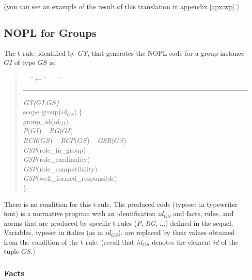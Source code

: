 \documentclass{article}
\newenvironment{rwrule}[2]
{\begin{quote}\ttfamily\begin{tabbing}~~~\=$\leftarrow$ \= ~~~ \= \kill
     \ensuremath{#2}\\
     \rule[2pt]{6.5cm}{.3pt} \hfill \rwlabel{#1}\\}
{\end{tabbing}\end{quote}}
\newcommand{\rwlabel}[1]{{\scshape\itshape\textrm{#1}}}
\theoremstyle{definition} \newtheorem{definition}{Definition}
\begin{document}
(you can see an example of the result of this translation in appendix \ref{apx:wp}.)


\subsection{NOPL for Groups}

The t-rule, identified by \rwlabel{GT}, that generates the NOPL code
for a group instance $GI$ of type $GS$ is:
\begin{rwrule}{GT($GI$,$GS$)}
{ } 
scope group($id_{GS}$) \{ \\
   \>  group\_id($id_{GI}$).\\
   \> \rwlabel{P}($GI$) ~ \rwlabel{RG}($GI$)\\
   \> \rwlabel{RCR}($GS$) ~ \rwlabel{RCP}($GS$) ~ \rwlabel{GSR}($GS$)\\
   \> \rwlabel{GSP}(role\_in\_group)\\
   \> \rwlabel{GSP}(role\_cardinality)\\
   \> \rwlabel{GSP}(role\_compatibility)\\
   \> \rwlabel{GSP}(well\_formed\_responsible)\\
\}
\end{rwrule}
There is no  condition for this t-rule. The produced code (typeset in
typewriter font) is a normative program with an identification
$id_{GS}$ and facts, rules, and norms that are produced by specific
t-rules (\rwlabel{P}, \rwlabel{RG}, ...)  defined in the
sequel. Variables, typeset in italics (as in $id_{GS}$), are replaced
by their values obtained from the condition of the t-rule. (recall
that $id_{GS}$ denotes the element $id$ of the tuple $GS$.)

\subsubsection{Facts}
\end{document}
